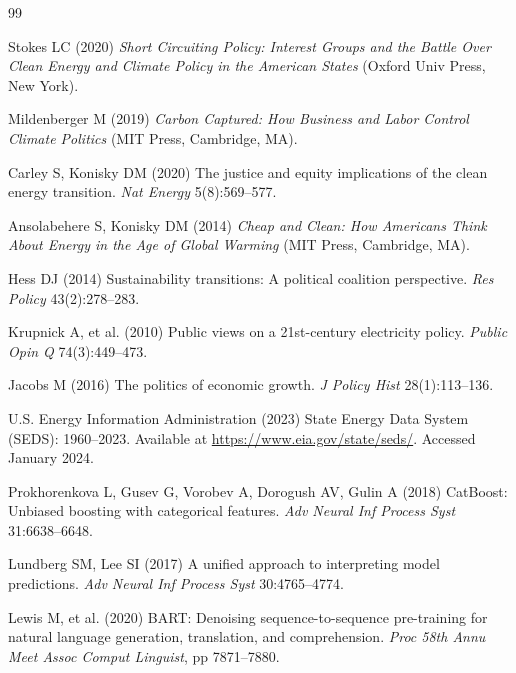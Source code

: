 \documentclass[9pt,twoside]{pnas-new}
\begin{document}


\showacknow

\begin{thebibliography}{99}

Stokes LC (2020)
\newblock \textit{Short Circuiting Policy: Interest Groups and the Battle Over
Clean Energy and Climate Policy in the American States}
(Oxford Univ Press, New York).

Mildenberger M (2019)
\newblock \textit{Carbon Captured: How Business and Labor Control Climate Politics}
(MIT Press, Cambridge, MA).

Carley S, Konisky DM (2020)
\newblock The justice and equity implications of the clean energy transition.
\newblock \textit{Nat Energy} 5(8):569--577.

Ansolabehere S, Konisky DM (2014)
\newblock \textit{Cheap and Clean: How Americans Think About Energy in the Age of
Global Warming}
(MIT Press, Cambridge, MA).

Hess DJ (2014)
\newblock Sustainability transitions: A political coalition perspective.
\newblock \textit{Res Policy} 43(2):278--283.

Krupnick A, et al. (2010)
\newblock Public views on a 21st-century electricity policy.
\newblock \textit{Public Opin Q} 74(3):449--473.

Jacobs M (2016)
\newblock The politics of economic growth.
\newblock \textit{J Policy Hist} 28(1):113--136.

U.S. Energy Information Administration (2023)
\newblock State Energy Data System (SEDS): 1960--2023.
\newblock Available at \url{https://www.eia.gov/state/seds/}.
Accessed January 2024.

Prokhorenkova L, Gusev G, Vorobev A, Dorogush AV, Gulin A (2018)
\newblock CatBoost: Unbiased boosting with categorical features.
\newblock \textit{Adv Neural Inf Process Syst} 31:6638--6648.

Lundberg SM, Lee SI (2017)
\newblock A unified approach to interpreting model predictions.
\newblock \textit{Adv Neural Inf Process Syst} 30:4765--4774.

Lewis M, et al. (2020)
\newblock BART: Denoising sequence-to-sequence pre-training for natural language
generation, translation, and comprehension.
\newblock \textit{Proc 58th Annu Meet Assoc Comput Linguist}, pp 7871--7880.

\end{thebibliography}
\end{document}
